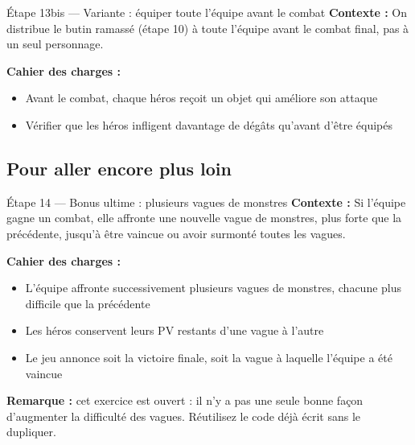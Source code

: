 \begin{UPSTIManipulation}{Étape 13bis — Variante : équiper toute l'équipe avant le combat}
  \textbf{Contexte :} On distribue le butin ramassé (étape 10) à toute l'équipe avant le combat
  final, pas à un seul personnage.

  \textbf{Cahier des charges :}
  \begin{itemize}
    \item Avant le combat, chaque héros reçoit un objet qui améliore son attaque
    \item Vérifier que les héros infligent davantage de dégâts qu'avant d'être équipés
  \end{itemize}

\end{UPSTIManipulation}

\subsection{Pour aller encore plus loin}

\begin{UPSTIManipulation}{Étape 14 — Bonus ultime : plusieurs vagues de monstres}
  \textbf{Contexte :} Si l'équipe gagne un combat, elle affronte une nouvelle vague de
  monstres, plus forte que la précédente, jusqu'à être vaincue ou avoir surmonté toutes les
  vagues.

  \textbf{Cahier des charges :}
  \begin{itemize}
    \item L'équipe affronte successivement plusieurs vagues de monstres, chacune plus difficile
      que la précédente
    \item Les héros conservent leurs PV restants d'une vague à l'autre
    \item Le jeu annonce soit la victoire finale, soit la vague à laquelle l'équipe a été
      vaincue
  \end{itemize}

  \textbf{Remarque :} cet exercice est ouvert : il n'y a pas une seule bonne façon d'augmenter
  la difficulté des vagues. Réutilisez le code déjà écrit sans le dupliquer.

\end{UPSTIManipulation}
